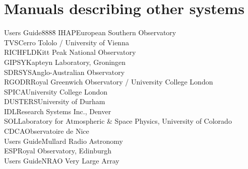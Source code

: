 \section {Manuals describing other systems}
\begin{tabbing}
Users Guide888\=8\kill
IHAP\>European Southern Observatory\\
TVS\>Cerro Tololo / University of Vienna\\
RICHFLD\>Kitt Peak National Observatory\\
GIPSY\>Kapteyn Laboratory, Groningen\\
SDRSYS\>Anglo-Australian Observatory\\
RGODR\>Royal Greenwich Observatory / University College London\\
SPICA\>University College London\\
DUSTERS\>University of Durham\\
IDL\>Research Systems Inc., Denver\\
SOL\>Laboratory for Atmospheric \& Space Physics, University of Colorado\\
CDCA\>Observatoire de Nice\\
Users Guide\>Mullard Radio Astronomy\\
ESP\>Royal Observatory, Edinburgh\\
Users Guide\>NRAO Very Large Array
\end{tabbing}

